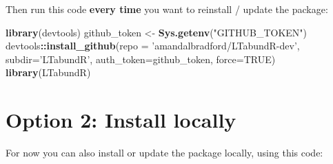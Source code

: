 \documentclass[
]{book}
\newenvironment{Shaded}{\begin{snugshade}}{\end{snugshade}}
\newcommand{\CommentTok}[1]{\textcolor[rgb]{0.56,0.35,0.01}{\textit{#1}}}
\newcommand{\ControlFlowTok}[1]{\textcolor[rgb]{0.13,0.29,0.53}{\textbf{#1}}}
\newcommand{\DataTypeTok}[1]{\textcolor[rgb]{0.13,0.29,0.53}{#1}}
\newcommand{\KeywordTok}[1]{\textcolor[rgb]{0.13,0.29,0.53}{\textbf{#1}}}
\newcommand{\NormalTok}[1]{#1}
\newcommand{\OperatorTok}[1]{\textcolor[rgb]{0.81,0.36,0.00}{\textbf{#1}}}
\newcommand{\OtherTok}[1]{\textcolor[rgb]{0.56,0.35,0.01}{#1}}
\newcommand{\StringTok}[1]{\textcolor[rgb]{0.31,0.60,0.02}{#1}}
\begin{document}
Then run this code \textbf{every time} you want to reinstall / update the package:

\begin{Shaded}
\begin{Highlighting}[]
\KeywordTok{library}\NormalTok{(devtools)}
\NormalTok{github_token <-}\StringTok{ }\KeywordTok{Sys.getenv}\NormalTok{(}\StringTok{"GITHUB_TOKEN"}\NormalTok{)}
\NormalTok{devtools}\OperatorTok{::}\KeywordTok{install_github}\NormalTok{(}\DataTypeTok{repo =} \StringTok{'amandalbradford/LTabundR-dev'}\NormalTok{,}
                         \DataTypeTok{subdir=}\StringTok{'LTabundR'}\NormalTok{,}
                         \DataTypeTok{auth_token=}\NormalTok{github_token,}
                         \DataTypeTok{force=}\OtherTok{TRUE}\NormalTok{)}
\KeywordTok{library}\NormalTok{(LTabundR)}
\end{Highlighting}
\end{Shaded}

\hypertarget{option-2-install-locally}{%
\section*{Option 2: Install locally}\label{option-2-install-locally}}

For now you can also install or update the package locally, using this code:

\begin{Shaded}
\end{Shaded}
\end{document}
